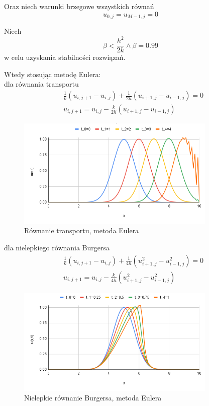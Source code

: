 \documentclass[12pt, a4paper]{article}
\begin{document}
Oraz niech warunki brzegowe wszystkich równań
\begin{equation}
u_{0,j}=u_{M-1,j}=0
\end{equation}

Niech 
\begin{equation}
\beta<\frac{h^{2}}{2k}\land\beta=0.99
\end{equation}
w celu uzyskania stabilności rozwiązań.
\newpage

Wtedy stosując metodę Eulera:\\
dla równania transportu
\begin{equation}
\begin{split}
& \frac{1}{k}(u_{i,j+1}-u_{i,j})+\frac{1}{2h}(u_{i+1,j}-u_{i-1,j})=0\\
& u_{i,j+1}=u_{i,j}-\frac{k}{2h}(u_{i+1,j}-u_{i-1,j})
\end{split}
\end{equation}
\begin{figure}[h]
\caption{Równanie transportu, metoda Eulera}
\centering
\includegraphics[width=0.85\textwidth]{0}
\end{figure}

dla nielepkiego równania Burgersa
\begin{equation}
\begin{split}
& \frac{1}{k}(u_{i,j+1}-u_{i,j})+\frac{1}{4h}(u_{i+1,j}^{2}-u_{i-1,j}^{2})=0\\
& u_{i,j+1}=u_{i,j}-\frac{k}{4h}(u_{i+1,j}^{2}-u_{i-1,j}^{2})
\end{split}
\end{equation}
\begin{figure}[h]
\caption{Nielepkie równanie Burgersa, metoda Eulera}
\centering
\includegraphics[width=0.85\textwidth]{1}
\end{figure}
\newpage
\end{document}
